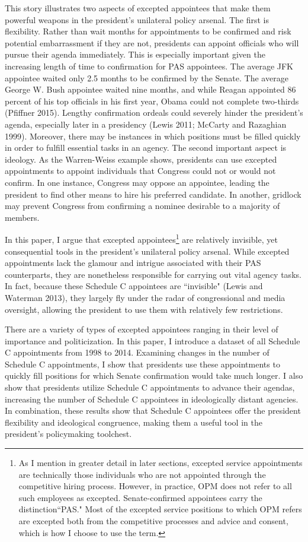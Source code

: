 \documentclass[12pt]{article}
\begin{document}
	This story illustrates two aspects of excepted appointees that make them powerful weapons in the president's unilateral policy arsenal. The first is flexibility. Rather than wait months for appointments to be confirmed and risk potential embarrassment if they are not, presidents can appoint officials who will pursue their agenda immediately. This is especially important given the increasing length of time to confirmation for PAS appointees. The average JFK appointee waited only 2.5 months to be confirmed by the Senate. The average George W. Bush appointee waited nine months, and while Reagan appointed 86 percent of his top officials in his first year, Obama could not complete two-thirds (Pfiffner 2015). Lengthy confirmation ordeals could severely hinder the president's agenda, especially later in a presidency (Lewis 2011; McCarty and Razaghian 1999). Moreover, there may be instances in which positions must be filled quickly in order to fulfill essential tasks in an agency. The second important aspect is ideology. As the Warren-Weiss example shows, presidents can use excepted appointments to appoint individuals that Congress could not or would not confirm. In one instance, Congress may oppose an appointee, leading the president to find other means to hire his preferred candidate. In another, gridlock may prevent Congress from confirming a nominee desirable to a majority of members.
	
	In this paper, I argue that excepted appointees\footnote{As I mention in greater detail in later sections, excepted service appointments are technically those individuals who are not appointed through the competitive hiring process. However, in practice, OPM does not refer to all such employees as excepted. Senate-confirmed appointees carry the distinction``PAS." Most of the excepted service positions to which OPM refers are excepted both from the competitive processes and advice and consent, which is how I choose to use the term.} are relatively invisible, yet consequential tools in the president's unilateral policy arsenal. While excepted appointments lack the glamour and intrigue associated with their PAS counterparts, they are nonetheless responsible for carrying out vital agency tasks. In fact, because these Schedule C appointees are ``invisible" (Lewis and Waterman 2013), they largely fly under the radar of congressional and media oversight, allowing the president to use them with relatively few restrictions. 

		There are a variety of types of excepted appointees ranging in their level of importance and politicization. In this paper, I introduce a dataset of all Schedule C appointments from 1998 to 2014. Examining changes in the number of Schedule C appointments, I show that presidents use these appointments to quickly fill positions for which Senate confirmation would take much longer. I also show that presidents utilize Schedule C appointments to advance their agendas, increasing the number of Schedule C appointees in ideologically distant agencies. In combination, these results show that Schedule C appointees offer the president flexibility and ideological congruence, making them a useful tool in the president's policymaking toolchest.
		
\end{document}
